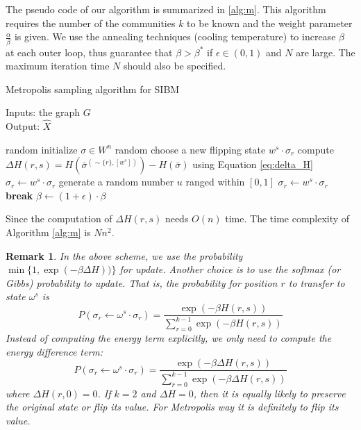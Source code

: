 \documentclass{article}
\newtheorem{remark}{Remark}
\begin{document}
	The pseudo code of our algorithm is summarized in \ref{alg:m}. This algorithm requires the number of the communities $k$ to be known and the weight parameter $\frac{\alpha}{\beta}$ is given. We use the annealing techniques (cooling temperature) to increase $\beta$ at each outer loop, thus guarantee that $\beta > \beta^*$
	if $\epsilon \in (0, 1)$ and $N$ are large. 
	The maximum iteration time $N$ should also be specified.
	\begin{algorithm}[H]
		\caption{Metropolis sampling algorithm for SIBM} \label{alg:m}
		Inputs: the graph $G$ \\
		Output: $\hat{X}$
		\begin{algorithmic}[1]
			\STATE random initialize $\sigma \in W^n$
			\STATE random choose a new flipping state $w^s \cdot \sigma_r$
			\STATE compute $\Delta H(r,s) = H(\bar{\sigma}^{(\sim \{r\}, [w^s])}) - H(\bar{\sigma})$ using Equation \eqref{eq:delta_H}
			\STATE $\sigma_r \leftarrow w^s \cdot \sigma_r$
			\ELSE
			\STATE generate a random number $u$ ranged within $[0,1]$
			\STATE $\sigma_r \leftarrow w^s \cdot \sigma_r$
			\ENDIF
			\ENDIF
			\ENDFOR
			\STATE \textbf{break}
			\ENDIF
			\STATE $\beta \leftarrow (1 + \epsilon)\cdot\beta$
			\ENDWHILE
		\end{algorithmic}
	\end{algorithm}
	Since the computation of $\Delta H(r,s)$ needs $O(n)$ time. The time complexity of Algorithm \ref{alg:m} is $Nn^2$.
	\begin{remark}
	In the above scheme, we use the probability $\min\{1, \exp(-\beta \Delta H))\}$ for update. Another choice is to use
	the softmax (or Gibbs) probability to update. That is, the probability for position $r$ to transfer to state $\omega^s$ is
	$$
	P(\sigma_r \leftarrow \omega^s \cdot \sigma_r) = \frac{\exp(-\beta H(r, s))}{\sum_{r=0}^{k-1} \exp(-\beta H(r, s))}
	$$
	Instead of computing the energy term explicitly, we only need to compute the energy difference term:
	$$
	P(\sigma_r \leftarrow \omega^s \cdot \sigma_r) = \frac{\exp(-\beta \Delta H(r, s))}{\sum_{r=0}^{k-1} \exp(-\beta \Delta H(r, s))}
	$$
	where $\Delta H(r, 0) = 0$.
	If $k=2$ and $\Delta H = 0$, then it is equally likely to preserve the original state or flip its value. For Metropolis way it is
	definitely to flip its value.
	\end{remark}
\end{document}
